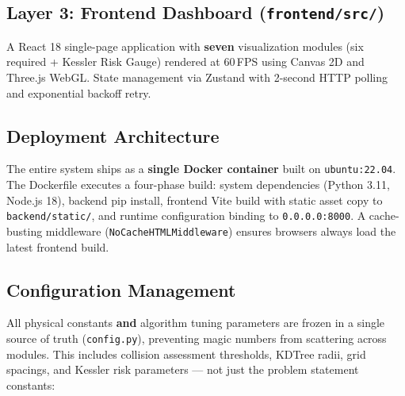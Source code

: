 \documentclass[11pt,a4paper]{article}
\begin{document}
\subsection{Layer 3: Frontend Dashboard (\texttt{frontend/src/})}

A React 18 single-page application with \textbf{seven} visualization modules
(six required + Kessler Risk Gauge) rendered at 60\,FPS using Canvas 2D and
Three.js WebGL. State management via Zustand with 2-second HTTP polling and
exponential backoff retry.

\subsection{Deployment Architecture}

The entire system ships as a \textbf{single Docker container} built on
\texttt{ubuntu:22.04}. The Dockerfile executes a four-phase build:
system dependencies (Python 3.11, Node.js 18), backend pip install, frontend
Vite build with static asset copy to \texttt{backend/static/}, and runtime
configuration binding to \texttt{0.0.0.0:8000}. A cache-busting middleware
(\texttt{NoCacheHTMLMiddleware}) ensures browsers always load the latest
frontend build.

\subsection{Configuration Management}

All physical constants \textbf{and} algorithm tuning parameters are frozen in a
single source of truth (\texttt{config.py}), preventing magic numbers from
scattering across modules. This includes collision assessment thresholds,
KDTree radii, grid spacings, and Kessler risk parameters --- not just the
problem statement constants:
\end{document}
